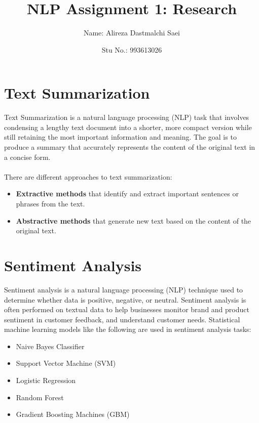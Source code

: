 \documentclass{article}
\title{\textbf{\Huge NLP Assignment 1: Research}}
\author{Name: Alireza Dastmalchi Saei}
\date{Stu No.: 993613026}
\begin{document}
\maketitle

\pagebreak

\section{Text Summarization}
Text Summarization is a natural language processing (NLP) task that involves condensing a lengthy text document into a shorter, more compact version while still retaining the most important information and meaning. The goal is to produce a summary that accurately represents the content of the original text in a concise form.\\\\
There are different approaches to text summarization:
\begin{itemize}
  \item \textbf{Extractive methods} that identify and extract important sentences or phrases from the text.
  \item \textbf{Abstractive methods} that generate new text based on the content of the original text.
\end{itemize}

\section{Sentiment Analysis}
Sentiment analysis is a natural language processing (NLP) technique used to determine whether data is positive, negative, or neutral. Sentiment analysis is often performed on textual data to help businesses monitor brand and product sentiment in customer feedback, and understand customer needs. Statistical machine learning models like the following are used in sentiment analysis tasks:
\begin{itemize}
  \item Naive Bayes Classifier
  \item Support Vector Machine (SVM)
  \item Logistic Regression
  \item Random Forest
  \item Gradient Boosting Machines (GBM)
\end{itemize}
\end{document}
